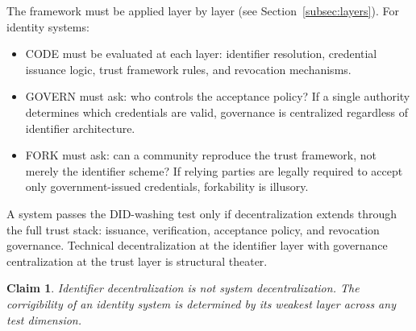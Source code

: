 \documentclass{article}
\newtheorem{claim}{Claim}
\begin{document}
The framework must be applied layer by layer (see Section~\ref{subsec:layers}). For identity systems:

\begin{itemize}[noitemsep,topsep=0pt]
    \item CODE must be evaluated at each layer: identifier resolution, credential issuance logic, trust framework rules, and revocation mechanisms.
    \item GOVERN must ask: who controls the acceptance policy? If a single authority determines which credentials are valid, governance is centralized regardless of identifier architecture.
    \item FORK must ask: can a community reproduce the trust framework, not merely the identifier scheme? If relying parties are legally required to accept only government-issued credentials, forkability is illusory.
\end{itemize}

A system passes the DID-washing test only if decentralization extends through the full trust stack: issuance, verification, acceptance policy, and revocation governance. Technical decentralization at the identifier layer with governance centralization at the trust layer is structural theater.

\begin{claim}
Identifier decentralization is not system decentralization. The corrigibility of an identity system is determined by its weakest layer across any test dimension.
\end{claim}
\end{document}
